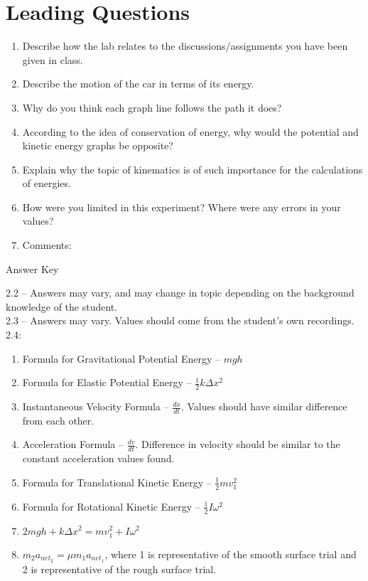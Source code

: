 \documentclass[12pt, letterpaper]{report}
\begin{document}
    \section{Leading Questions}
      \begin{enumerate}
        \item{Describe how the lab relates to the discussions/assignments you have been given in class.}
        \item{Describe the motion of the car in terms of its energy.}
        \item{Why do you think each graph line follows the path it does?}
        \item{According to the idea of conservation of energy, why would the potential and kinetic energy graphs be opposite?}
        \item{Explain why the topic of kinematics is of such importance for the calculations of energies.}
        \item{How were you limited in this experiment? Where were any errors in your values?}
        \item{Comments:}
      \end{enumerate}
\pagebreak
\begin{center}
  Answer Key
    \end{center}
    2.2 -- Answers may vary, and may change in topic depending on the background knowledge of the student. \\
    2.3 -- Answers may vary. Values should come from the student's own recordings. \\
    2.4:
    \begin{enumerate}
      \item{Formula for Gravitational Potential Energy -- $mgh$}
      \item{Formula for Elastic Potential Energy -- $\frac{1}{2}k\Delta x^{2}$}
      \item{Instantaneous Velocity Formula -- $\frac{dx}{dt}$}. Values should have similar difference from each other.
      \item{Acceleration Formula -- $\frac{dv}{dt}$. Difference in velocity should be similar to the constant acceleration values found.}
      \item{Formula for Translational Kinetic Energy -- $\frac{1}{2}mv_{1}^{2}$}
      \item{Formula for Rotational Kinetic Energy -- $\frac{1}{2}I\omega^{2}$}
      \item{$2mgh+k\Delta x^{2}=mv_{1}^{2}+I\omega^{2}$}
      \item{$m_{2}a_{net_{2}}=\mu m_{1}a_{net_{1}}$, where 1 is representative of the smooth surface trial and 2 is representative of the rough surface trial.}
    \end{enumerate}
\end{document}
